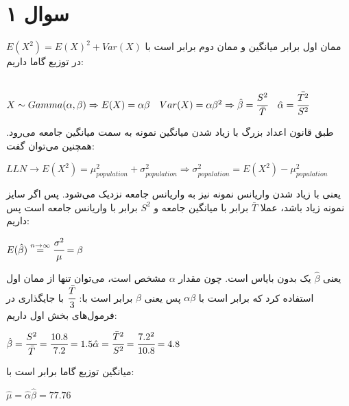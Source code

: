 \documentclass[12pt]{article}
\begin{document}
	\section*{سوال ۱}
ممان اول برابر میانگین و ممان دوم برابر است با 
$E(X^2) = E(X)^2 + Var(X)$
در توزیع گاما داریم:
\begin{latin}
	~\\
	$
	X \sim Gamma(\alpha, \beta) \Rightarrow E(X) = \alpha \beta \quad Var(X) = \alpha \beta^2
	\\
	\Rightarrow \hat{\beta} = \cfrac{S^2}{\bar{T}} \quad \hat{\alpha} = \cfrac{\bar{T^2}}{S^2}
	$
\end{latin}
طبق قانون اعداد بزرگ با زیاد شدن 
میانگین نمونه به سمت میانگین جامعه می‌رود. همچنین می‌توان گفت:
\begin{latin}
	$
	LLN \rightarrow E(X^2) = \mu_{population}^2 + \sigma_{population}^2 \Rightarrow 
	\sigma_{population}^2  =  E(X^2) - \mu_{population}^2
	$
\end{latin}
یعنی با زیاد شدن 
واریانس نمونه نیز به واریانس جامعه نزدیک می‌شود.
پس اگر سایز نمونه زیاد باشد، عملا 
$\bar{T}$
برابر با میانگین جامعه و 
$S^2$
برابر با واریانس جامعه است پس داریم:
\begin{latin}
	$
	E(\hat{\beta})  \stackrel{n\rightarrow\infty}{=} \cfrac{\sigma^2}{\mu} = \beta
	$
\end{latin}
	یعنی 
	$\hat{\beta}$
	یک 
	بدون بایاس است.
	چون مقدار
	$\alpha$
	مشخص است، می‌توان تنها از ممان اول استفاده کرد که برابر است با 
	$\alpha \beta $
	پس یعنی 
	$\beta$
	برابر است با:
	$\cfrac{\bar{T}}{3}$
	با جایگذاری در فرمول‌های بخش اول داریم:
	\begin{latin}
		$
		\hat{\beta} = \cfrac{S^2}{\bar{T}} = \cfrac{10.8}{7.2} = 1.5
		\\
		\hat{\alpha} = \cfrac{\bar{T}^2}{S^2} = \cfrac{7.2^2}{10.8} = 4.8
		$
	\end{latin}
	میانگین توزیع گاما برابر است با:
	\begin{latin}
	$
	\hat{\mu}=  \hat{\alpha} \hat{\beta} = 77.76
	$
		\end{latin}
\end{document}
